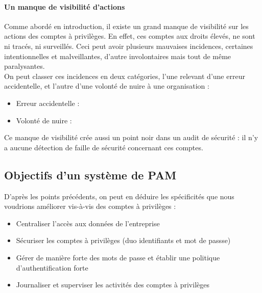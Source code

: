 \paragraph{Un manque de visibilité d'actions} Comme abordé en introduction, il existe un grand manque de visibilité sur les actions des comptes à privilèges. En effet, ces comptes aux droits élevés, ne sont ni tracés, ni surveillés. Ceci peut avoir plusieurs mauvaises incidences, certaines intentionnelles et malveillantes, d'autre involontaires mais tout de même paralysantes.\\
On peut classer ces incidences en deux catégories, l'une relevant d'une erreur accidentelle, et l'autre d'une volonté de nuire à une organisation :
\begin{itemize}
	\item Erreur accidentelle :
	\item Volonté de nuire :
\end{itemize}

Ce manque de  visibilité crée aussi un point noir dans un audit de sécurité : il n'y a aucune détection de faille de sécurité concernant ces comptes.

\subsection{Objectifs d'un système de PAM}

D'après les points précédents, on peut en déduire les spécificités que nous voudrions améliorer vis-à-vis des comptes à privilèges :
\begin{itemize}
	\item Centraliser l’accès aux données de l’entreprise
 	\item Sécuriser les comptes à privilèges (duo identifiants et mot de passse)
 	\item Gérer de manière forte des mots de passe et établir une politique d’authentification forte
	\item Journaliser et superviser les activités des comptes à privilèges
\end{itemize}

